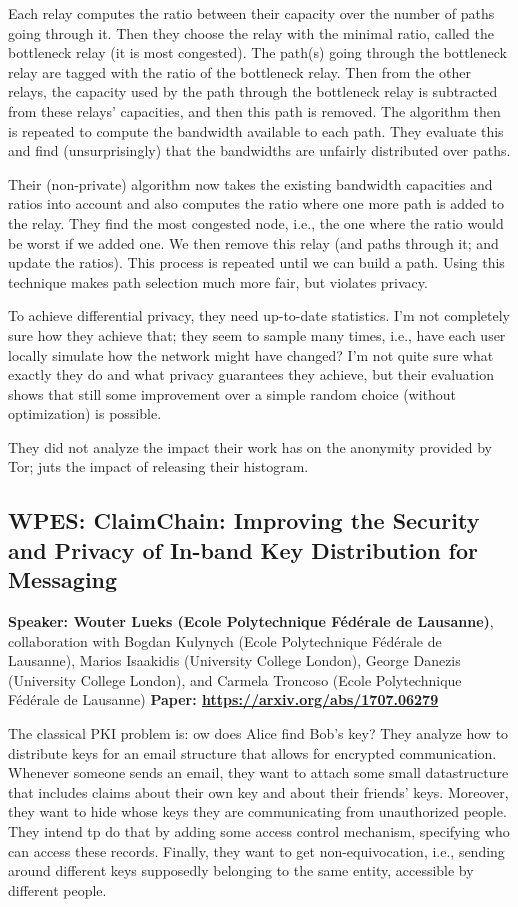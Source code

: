 \documentclass{article}
\begin{document}
Each relay computes the ratio between their capacity over the number of paths going through it. Then they choose the relay with the minimal ratio, called the bottleneck relay (it is most congested). The path(s) going through the bottleneck relay are tagged with the ratio of the bottleneck relay. Then from the other relays, the capacity used by the path through the bottleneck relay is subtracted from these relays' capacities, and then this path is removed. The algorithm then is repeated to compute the bandwidth available to each path. They evaluate this and find (unsurprisingly) that the bandwidths are unfairly distributed over paths.

Their (non-private) algorithm now takes the existing bandwidth capacities and ratios into account and also computes the ratio where one more path is added to the relay. They find the most congested node, i.e., the one where the ratio would be worst if we added one. We then remove this relay (and paths through it; and update the ratios). This process is repeated until we can build a path. Using this technique makes path selection much more fair, but violates privacy.

To achieve differential privacy, they need up-to-date statistics. I'm not completely sure how they achieve that; they seem to sample many times, i.e., have each user locally simulate how the network might have changed? I'm not quite sure what exactly they do and what privacy guarantees they achieve, but their evaluation shows that still some improvement over a simple random choice (without optimization) is possible.

They did not analyze the impact their work has on the anonymity provided by Tor; juts the impact of releasing their histogram.


\subsection{WPES: ClaimChain: Improving the Security and Privacy of In-band Key Distribution for Messaging}
\noindent\textbf{Speaker: Wouter Lueks (Ecole Polytechnique Fédérale de Lausanne)}, collaboration with Bogdan Kulynych (Ecole Polytechnique Fédérale de Lausanne), Marios Isaakidis (University College London), George Danezis (University College London), and Carmela Troncoso (Ecole Polytechnique Fédérale de Lausanne) 
\noindent\textbf{Paper: \url{https://arxiv.org/abs/1707.06279}}

The classical PKI problem is: ow does Alice find Bob's key?
They analyze how to distribute keys for an email structure that allows for encrypted communication. Whenever someone sends an email, they want to attach some small datastructure that includes claims about their own key and about their friends' keys. Moreover, they want to hide whose keys they are communicating from unauthorized people. They intend tp do that by adding some access control mechanism, specifying who can access these records. Finally, they want to get non-equivocation, i.e., sending around different keys supposedly belonging to the same entity, accessible by different people.
\end{document}
